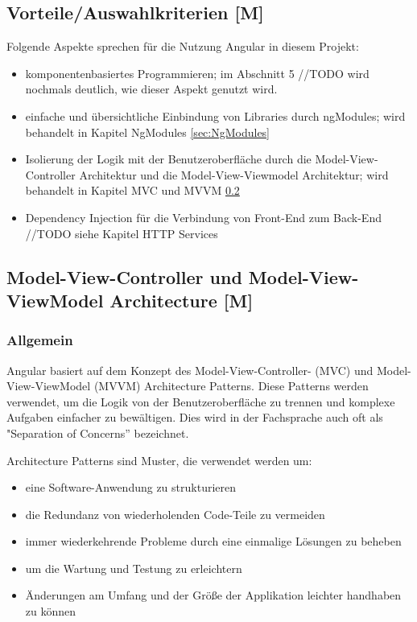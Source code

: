 \subsection{Vorteile/Auswahlkriterien [M]}
Folgende Aspekte sprechen für die Nutzung Angular in diesem Projekt:

\begin{itemize}
  \item komponentenbasiertes Programmieren;
  im Abschnitt 5 //TODO wird nochmals deutlich, wie dieser Aspekt genutzt wird.
  \item einfache und übersichtliche Einbindung von Libraries durch ngModules; wird behandelt in Kapitel NgModules \ref{sec:NgModules} 
  \item Isolierung der Logik mit der Benutzeroberfläche durch die Model-View-Controller Architektur und die Model-View-Viewmodel Architektur; wird behandelt in Kapitel MVC und MVVM \ref{sec:MVCandMVVM} 
  \item 
  Dependency Injection für die Verbindung von Front-End zum Back-End //TODO siehe Kapitel HTTP Services
\end{itemize}

\subsection{Model-View-Controller und Model-View-ViewModel Architecture [M]}\label{sec:MVCandMVVM}
\subsubsection{Allgemein}

Angular basiert auf dem Konzept des Model-View-Controller- (MVC) und Model-View-ViewModel (MVVM) Architecture Patterns. Diese Patterns werden verwendet, um die Logik von der Benutzeroberfläche zu trennen und komplexe Aufgaben einfacher zu bewältigen. Dies wird in der Fachsprache auch oft als "Separation of Concerns” bezeichnet.
\cite{AngularArchitecturePattern}

Architecture Patterns sind Muster, die verwendet werden um:
\begin{itemize}
  \item eine Software-Anwendung zu strukturieren
  \item die Redundanz von wiederholenden Code-Teile zu vermeiden 
  \item immer wiederkehrende Probleme durch eine einmalige Lösungen zu beheben
  \item um die Wartung und Testung zu erleichtern
  \item Änderungen am Umfang und der Größe der Applikation leichter handhaben zu können
\end{itemize}

